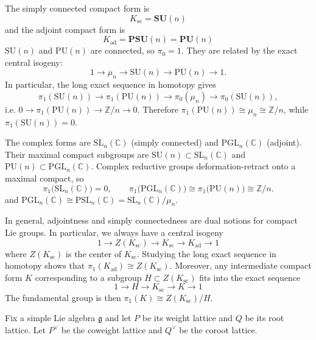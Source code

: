 \documentclass[12pt]{article}
\begin{document}
\begin{example}
    The simply connected compact form is \[K_{\mathrm{sc}}=\mathbf{SU}(n)\] and the adjoint compact form is \[K_{\mathrm{ad}}=\mathbf{PSU}(n)=\mathbf{PU}(n)\]
    $\mathrm{SU}(n)$ and $\mathrm{PU}(n)$ are connected, so $\pi_0=1$. They are related by the exact central isogeny:
    \[
        1\to\mu_n\to \mathrm{SU}(n)\to\mathrm{PU}(n)\to 1.
    \]
    In particular, the long exact sequence in homotopy gives
    \[
        \pi_1(\mathrm{SU}(n)) \to \pi_1(\mathrm{PU}(n)) \to \pi_0(\mu_n) \to \pi_0(\mathrm{SU}(n)),
    \]
    i.e. $0 \to \pi_1(\mathrm{PU}(n)) \to \mathbb Z/n \to 0$. Therefore $\pi_1(\mathrm{PU}(n))\cong \mu_n\cong \mathbb Z/n$, while $\pi_1(\mathrm{SU}(n))=0$.

    The complex forms are $\mathrm{SL}_n(\mathbb C)$ (simply connected) and $\mathrm{PGL}_n(\mathbb C)$ (adjoint). Their maximal compact subgroups are $\mathrm{SU}(n)\subset \mathrm{SL}_n(\mathbb C)$ and $\mathrm{PU}(n)\subset \mathrm{PGL}_n(\mathbb C)$. Complex reductive groups deformation-retract onto a maximal compact, so
    \[
        \pi_1\big(\mathrm{SL}_n(\mathbb C)\big)=0,\qquad
        \pi_1\big(\mathrm{PGL}_n(\mathbb C)\big)\cong \pi_1\big(\mathrm{PU}(n)\big)\cong \mathbb Z/n.
    \]
    and $\mathrm{PGL}_n(\mathbb C)\cong \mathrm{PSL}_n(\mathbb C)=\mathrm{SL}_n(\mathbb C)/\mu_n$.
\end{example}
In general, adjointness and simply connectedness are dual notions for compact Lie groups. In particular, we always have a central isogeny
\[ 1 \to Z(K_{\mathrm{sc}}) \to K_{\mathrm{sc}} \to K_{\mathrm{ad}} \to 1\]
where $Z(K_{\mathrm{sc}})$ is the center of $K_{\mathrm{sc}}$. Studying the long exact sequence in homotopy shows that $\pi_1(K_{\mathrm{ad}}) \cong Z(K_{\mathrm{sc}})$. Moreover, any intermediate compact form $K$ corresponding to a subgroup $H \subset Z(K_{\mathrm{sc}})$ fits into the exact sequence
\[ 1 \to H \to K_{\mathrm{sc}} \to K \to 1\]
The fundamental group is then $\pi_1(K) \cong Z(K_{\mathrm{sc}})/H$.

Fix a simple Lie algebra $\mathfrak g$ and let $P$ be its weight lattice and $Q$ be its root lattice. Let $P^\vee$ be the coweight lattice and $Q^\vee$ be the coroot lattice.
\end{document}
